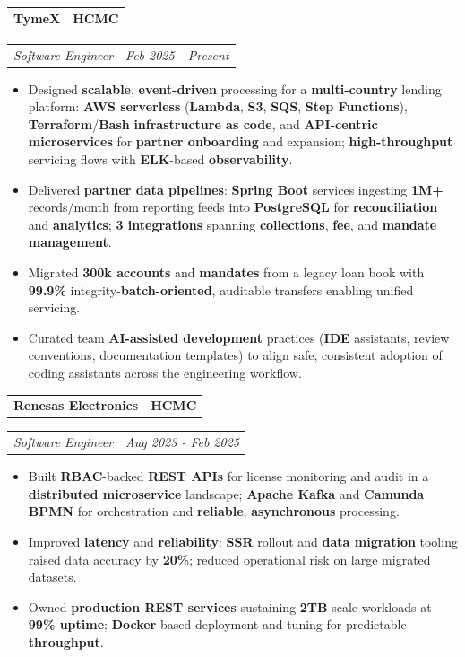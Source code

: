 \documentclass[10pt,letterpaper]{article}
\makeatletter
\newcommand{\headerrow}[2]
{\begin{tabular*}{\linewidth}{l@{\extracolsep{\fill}}r}
#1 &
#2 \\
\end{tabular*}}
\makeatother
\begin{document}
\parskip=0pt
\headerrow
{\large\textbf{TymeX}}
{\textbf{HCMC}}
\headerrow
{\emph{Software Engineer}}
{\emph{Feb 2025 - Present}}
\begin{itemize}
      \item Designed \textbf{scalable}, \textbf{event-driven} processing for a \textbf{multi-country} lending platform: \textbf{AWS serverless} (\textbf{Lambda}, \textbf{S3}, \textbf{SQS}, \textbf{Step Functions}), \textbf{Terraform}/\textbf{Bash} \textbf{infrastructure as code}, and \textbf{API-centric microservices} for \textbf{partner onboarding} and expansion; \textbf{high-throughput} servicing flows with \textbf{ELK}-based \textbf{observability}.
      \item Delivered \textbf{partner data pipelines}: \textbf{Spring Boot} services ingesting \textbf{1M+} records/month from reporting feeds into \textbf{PostgreSQL} for \textbf{reconciliation} and \textbf{analytics}; \textbf{3 integrations} spanning \textbf{collections}, \textbf{fee}, and \textbf{mandate management}.
      \item Migrated \textbf{300k accounts} and \textbf{mandates} from a legacy loan book with \textbf{99.9\%} integrity-\textbf{batch-oriented}, auditable transfers enabling unified servicing.
      \item Curated team \textbf{AI-assisted development} practices (\textbf{IDE} assistants, review conventions, documentation templates) to align safe, consistent adoption of coding assistants across the engineering workflow.
\end{itemize}
\parskip=0pt
\headerrow
{\large\textbf{Renesas Electronics}}
{\textbf{HCMC}}
\headerrow
{\emph{Software Engineer}}
{\emph{Aug 2023 - Feb 2025}}
\begin{itemize}
      \item Built \textbf{RBAC}-backed \textbf{REST APIs} for license monitoring and audit in a \textbf{distributed microservice} landscape; \textbf{Apache Kafka} and \textbf{Camunda BPMN} for orchestration and \textbf{reliable}, \textbf{asynchronous} processing.
      \item Improved \textbf{latency} and \textbf{reliability}: \textbf{SSR} rollout and \textbf{data migration} tooling raised data accuracy by \textbf{20\%}; reduced operational risk on large migrated datasets.
      \item Owned \textbf{production REST services} sustaining \textbf{2TB}-scale workloads at \textbf{99\% uptime}; \textbf{Docker}-based deployment and tuning for predictable \textbf{throughput}.
\end{itemize}
\end{document}
